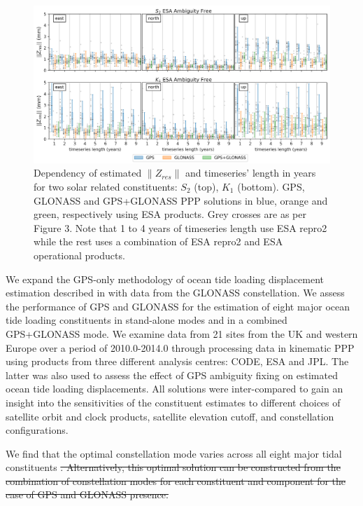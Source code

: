 \documentclass[se, manuscript]{copernicus}
\providecommand{\DIFdel}[1]{{\protect\color{red}\sout{#1}}}                      %
\providecommand{\DIFdelbegin}{} %
\begin{document}
\begin{figure}[t]
\includegraphics[width=17cm]{fig11.png}
\caption{Dependency of estimated $\|Z_{res}\|$ and timeseries’ length in years for two solar related constituents: $S_2$ (top), $K_1$ (bottom). GPS, GLONASS and GPS+GLONASS PPP solutions in blue, orange and green, respectively using ESA products. Grey crosses are as per Figure 3. Note that 1 to 4 years of timeseries length use ESA repro2 while the rest uses a combination of ESA repro2 and ESA operational products.}
\end{figure}

\conclusions %
We expand the GPS-only methodology of ocean tide loading displacement estimation described in \cite{Penna2015} with data from the GLONASS constellation. We assess the performance of GPS and GLONASS for the estimation of eight major ocean tide loading constituents in stand-alone modes and in a combined GPS+GLONASS mode. We examine data from 21 sites from the UK and western Europe over a period of 2010.0-2014.0 through processing data in kinematic PPP using products from three different analysis centres: CODE, ESA and JPL. The latter was also used to assess the effect of GPS ambiguity fixing on estimated ocean tide loading displacements. All solutions were inter-compared to gain an insight into the sensitivities of the constituent estimates to different choices of satellite orbit and clock products, satellite elevation cutoff, and constellation configurations.

We find that the optimal constellation mode varies across all eight major tidal constituents \DIFdelbegin \DIFdel{. Alternatively, this optimal solution can be constructed from the combination of constellation modes for each constituent and component for the case of GPS and GLONASS presence. }%
\end{document}
